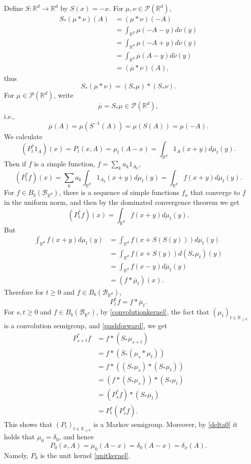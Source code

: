 \documentclass{article}
\theoremstyle{definition}
\theoremstyle{definition}
\begin{document}
Define $S:\mathbb{R}^d \to \mathbb{R}^d$ by $S(x)=-x$.
For $\mu,\nu \in \mathscr{P}(\mathbb{R}^d)$,
\begin{align*}
S_*(\mu*\nu)(A)&=(\mu*\nu)(-A)\\
&=\int_{\mathbb{R}^d} \mu(-A-y) d\nu(y)\\
&= \int_{\mathbb{R}^d} \mu(-A+y) d\overline{\nu}(y)\\
&=\int_{\mathbb{R}^d} \overline{\mu}(A-y) d\overline{\nu}(y)\\
&=(\overline{\mu}*\overline{\nu})(A),
\end{align*}
thus
\begin{equation}
S_*(\mu*\nu)=(S_*\mu)*(S_*\nu).
\label{pushforward}
\end{equation}
For $\mu \in \mathscr{P}(\mathbb{R}^d)$, write
\[
\overline{\mu} = S_*\mu \in \mathscr{P}(\mathbb{R}^d),
\]
i.e.,
\[
\overline{\mu}(A) = \mu(S^{-1}(A)) = \mu(S(A)) = \mu(-A).
\]
We calculate
\[
(P_t^* 1_A)(x) = P_t(x,A)= \mu_t(A-x) = \int_{\mathbb{R}^d} 1_A(x+y)d\mu_t(y).
\]
Then if $f$ is a simple function, $f=\sum_k a_k 1_{A_k}$,
\[
(P_t^* f)(x) = \sum_k a_k \int_{\mathbb{R}^d} 1_{A_k}(x+y) d\mu_t(y)
=\int_{\mathbb{R}^d} f(x+y) d\mu_t(y).
\]
For $f \in B_b(\mathscr{B}_{\mathbb{R}^d})$, there is a sequence of simple functions
$f_n$ that converge to $f$ in the uniform norm, and then by the dominated convergence theorem we get
\[
(P_t^*f)(x) = \int_{\mathbb{R}^d} f(x+y) d\mu_t(y).
\]
But
\begin{align*}
 \int_{\mathbb{R}^d} f(x+y) d\mu_t(y) &= \int_{\mathbb{R}^d} f(x+S(S(y))) d\mu_t(y)\\
& = \int_{\mathbb{R}^d} f(x+S(y)) d(S_*\mu_t)(y)\\
& = \int_{\mathbb{R}^d} f(x-y) d\overline{\mu}_t(y)\\
&= (f*\overline{\mu}_t)(x).
\end{align*}
Therefore for $t \geq 0$ and $f \in B_b(\mathscr{B}_{\mathbb{R}^d})$,
\begin{equation}
P_t^* f=  f*\overline{\mu}_t.
\label{convolutionkernel}
\end{equation}
For $s,t \geq 0$ and $f \in B_b(\mathscr{B}_{\mathbb{R}^d})$, by \eqref{convolutionkernel}, the fact that $(\mu_t)_{t \in \mathbb{R}_{\geq 0}}$ is a convolution
semigroup, and \eqref{pushforward}, we get
\begin{align*}
P_{s+t}^*f&=f*(S_*\mu_{s+t})\\
&=f*(S_*(\mu_s*\mu_t))\\
&=f*((S_*\mu_s)*(S_*\mu_t))\\
&=(f*(S_*\mu_s))*(S_*\mu_t)\\
&=(P_s^* f)*(S_*\mu_t)\\
&=P_t^* (P_s^*f).
\end{align*}
This shows that $(P_t)_{t \in \mathbb{R}_{\geq 0}}$ is a Markov semigroup. 
Moreover, by \eqref{delta0} it holds that $\mu_0=\delta_0$, and hence
\[
P_0(x,A) = \mu_0(A-x) = \delta_0(A-x) = \delta_x(A).
\]
Namely, $P_0$ is the unit kernel \eqref{unitkernel}. 
\end{document}
